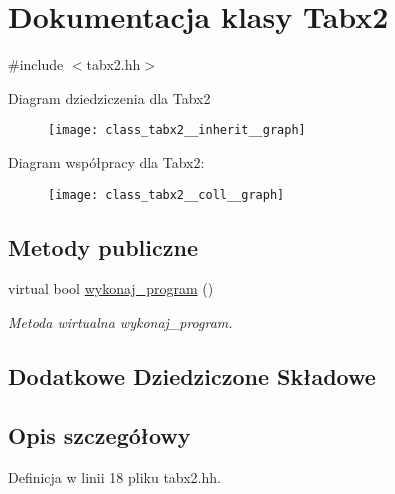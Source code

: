 \hypertarget{class_tabx2}{\section{Dokumentacja klasy Tabx2}
\label{class_tabx2}
}


{\ttfamily \#include $<$tabx2.\-hh$>$}



Diagram dziedziczenia dla Tabx2\nopagebreak
\begin{figure}[H]
\begin{center}
\leavevmode
\texttt{[image: class\_tabx2\_\_inherit\_\_graph]}
\end{center}
\end{figure}


Diagram współpracy dla Tabx2\-:\nopagebreak
\begin{figure}[H]
\begin{center}
\leavevmode
\texttt{[image: class\_tabx2\_\_coll\_\_graph]}
\end{center}
\end{figure}
\subsection*{Metody publiczne}
\begin{DoxyCompactItemize}
\item 
virtual bool \hyperlink{class_tabx2_a30db6636cba36a354443ec5f101fd188}{wykonaj\-\_\-program} ()
\begin{DoxyCompactList}\small\item\em Metoda wirtualna wykonaj\-\_\-program. \end{DoxyCompactList}\end{DoxyCompactItemize}
\subsection*{Dodatkowe Dziedziczone Składowe}


\subsection{Opis szczegółowy}


Definicja w linii 18 pliku tabx2.\-hh.



